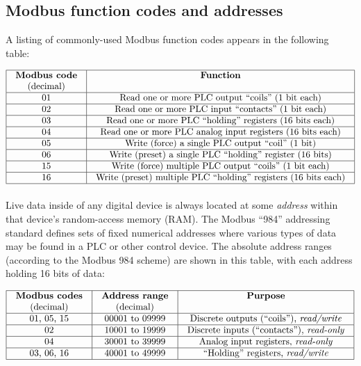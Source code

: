\filbreak
\subsection{Modbus function codes and addresses}

A listing of commonly-used Modbus function codes appears in the following table:


$$\vbox{\offinterlineskip
\halign{\strut
\vrule \quad\hfil # \ \hfil & 
\vrule \quad\hfil # \ \hfil \vrule \cr
\noalign{\hrule}
%
\textbf{Modbus code} & \textbf{Function} \cr
(decimal) &  \cr
%
\noalign{\hrule}
%
01 & Read one or more PLC output ``coils'' (1 bit each) \cr
%
\noalign{\hrule}
%
02 & Read one or more PLC input ``contacts'' (1 bit each) \cr
%
\noalign{\hrule}
%
03 & Read one or more PLC ``holding'' registers (16 bits each) \cr
%
\noalign{\hrule}
%
04 & Read one or more PLC analog input registers (16 bits each) \cr
%
\noalign{\hrule}
%
05 & Write (force) a single PLC output ``coil'' (1 bit) \cr
%
\noalign{\hrule}
%
06 & Write (preset) a single PLC ``holding'' register (16 bits) \cr
%
\noalign{\hrule}
%
15 & Write (force) multiple PLC output ``coils'' (1 bit each) \cr
%
\noalign{\hrule}
%
16 & Write (preset) multiple PLC ``holding'' registers (16 bits each) \cr
%
\noalign{\hrule}
} %
}$$ %

\vskip 10pt

Live data inside of any digital device is always located at some \textit{address} within that device's random-access memory (RAM).  The Modbus ``984'' addressing standard defines sets of fixed numerical addresses where various types of data may be found in a PLC or other control device.  The absolute address ranges (according to the Modbus 984 scheme) are shown in this table, with each address holding 16 bits of data:  


$$\vbox{\offinterlineskip
\halign{\strut
\vrule \quad\hfil # \ \hfil & 
\vrule \quad\hfil # \ \hfil & 
\vrule \quad\hfil # \ \hfil \vrule \cr
\noalign{\hrule}
%
\textbf{Modbus codes} & \textbf{Address range} & \textbf{Purpose} \cr
(decimal) & (decimal) & \cr
%
\noalign{\hrule}
%
01, 05, 15 & 00001 to 09999 & Discrete outputs (``coils''), \textit{read/write} \cr
%
\noalign{\hrule}
%
02 & 10001 to 19999 & Discrete inputs (``contacts''), \textit{read-only} \cr
%
\noalign{\hrule}
%
04 & 30001 to 39999 & Analog input registers, \textit{read-only} \cr
%
\noalign{\hrule}
%
03, 06, 16 & 40001 to 49999 & ``Holding'' registers, \textit{read/write} \cr
%
\noalign{\hrule}
} %
}$$ %

